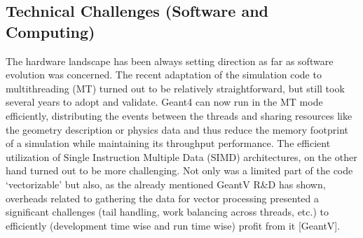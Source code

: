 \documentclass[10pt,a4paper]{article}
\begin{document}
\hypertarget{technical-challenges-software-and-computing-1}{%
\subsection{Technical Challenges (Software and
Computing)}\label{technical-challenges-software-and-computing-1}}

The hardware landscape has been always setting direction as far as
software evolution was concerned. The recent adaptation of the
simulation code to multithreading (MT) turned out to be relatively
straightforward, but still took several years to adopt and validate.
Geant4 can now run in the MT mode efficiently, distributing the events
between the threads and sharing resources like the geometry description
or physics data and thus reduce the memory footprint of a simulation
while maintaining its throughput performance. The efficient utilization
of Single Instruction Multiple Data (SIMD) architectures, on the other
hand turned out to be more challenging. Not only was a limited part of
the code `vectorizable' but also, as the already mentioned GeantV R\&D
has shown, overheads related to gathering the data for vector processing
presented a significant challenges (tail handling, work balancing across
threads, etc.) to efficiently (development time wise and run time wise)
profit from it {[}GeantV{]}.
\end{document}
